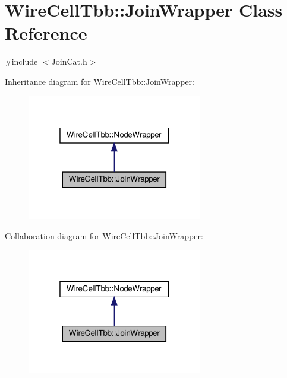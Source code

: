 \hypertarget{class_wire_cell_tbb_1_1_join_wrapper}{}\section{Wire\+Cell\+Tbb\+:\+:Join\+Wrapper Class Reference}
\label{class_wire_cell_tbb_1_1_join_wrapper}


{\ttfamily \#include $<$Join\+Cat.\+h$>$}



Inheritance diagram for Wire\+Cell\+Tbb\+:\+:Join\+Wrapper\+:
\nopagebreak
\begin{figure}[H]
\begin{center}
\leavevmode
\includegraphics[width=217pt]{class_wire_cell_tbb_1_1_join_wrapper__inherit__graph}
\end{center}
\end{figure}


Collaboration diagram for Wire\+Cell\+Tbb\+:\+:Join\+Wrapper\+:
\nopagebreak
\begin{figure}[H]
\begin{center}
\leavevmode
\includegraphics[width=217pt]{class_wire_cell_tbb_1_1_join_wrapper__coll__graph}
\end{center}
\end{figure}
